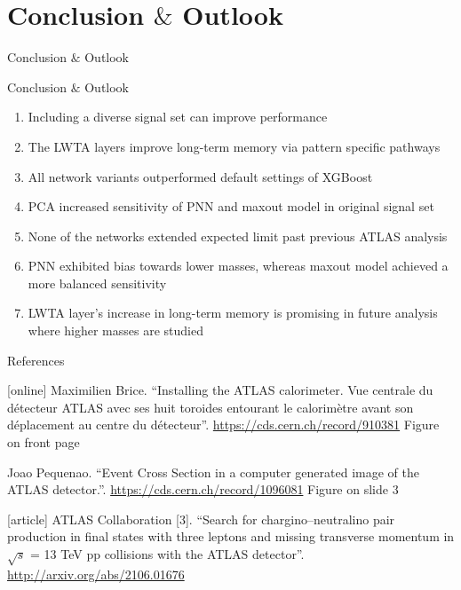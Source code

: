 \documentclass[UKenglish]{beamer}
\begin{document}
\section{Conclusion $\&$ Outlook}
\begin{frame}{Conclusion $\&$ Outlook}
    \tableofcontents[currentsection]
\end{frame}
\begin{frame}{Conclusion $\&$ Outlook}
    \begin{enumerate}
        \item Including a diverse signal set can improve performance
        \item The LWTA layers improve long-term memory via pattern specific pathways
        \item All network variants outperformed default settings of XGBoost
        \item PCA increased sensitivity of PNN and maxout model in original signal set
        \item None of the networks extended expected limit past previous ATLAS analysis
        \item PNN exhibited bias towards lower masses, whereas maxout model achieved a more balanced 
              sensitivity
        \item LWTA layer's increase in long-term memory is promising in future analysis 
              where higher masses are studied 
    \end{enumerate}
\end{frame}





\begin{frame}{References}
    \begin{thebibliography}{}
        \footnotesize
        [online]
        Maximilien Brice.
        \newblock \enquote{Installing the ATLAS calorimeter. Vue centrale du
        détecteur ATLAS avec ses huit toroides entourant le
        calorimètre avant son déplacement au centre du
        détecteur}.
        \newblock \url{https://cds.cern.ch/record/910381}
        \newblock Figure on front page

        Joao Pequenao.
        \newblock \enquote{Event Cross Section in a computer generated image of the ATLAS detector.}.
        \newblock \url{https://cds.cern.ch/record/1096081}
        \newblock Figure on slide 3

        
        [article]
        ATLAS Collaboration [3].
        \newblock \enquote{Search for chargino--neutralino pair production in final states with three leptons and missing transverse momentum in {$\sqrt{s}$} = 13 {TeV} pp collisions with the {ATLAS} detector}.
        \newblock \url{http://arxiv.org/abs/2106.01676}



    \end{thebibliography}
\end{frame}
\end{document}
